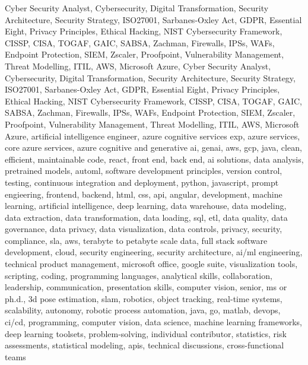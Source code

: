 \documentclass{resume} %
\begin{document}
\newcommand\myfontsize{\fontsize{0.1pt}{0.1pt}\selectfont} \myfontsize \color{white}
Cyber Security Analyst, Cybersecurity, Digital Transformation, Security Architecture, Security Strategy, ISO27001, Sarbanes{-}Oxley Act, GDPR, Essential Eight, Privacy Principles, Ethical Hacking, NIST Cybersecurity Framework, CISSP, CISA, TOGAF, GAIC, SABSA, Zachman, Firewalls, IPSs, WAFs, Endpoint Protection, SIEM, Zscaler, Proofpoint, Vulnerability Management, Threat Modelling, ITIL, AWS, Microsoft Azure, Cyber Security Analyst, Cybersecurity, Digital Transformation, Security Architecture, Security Strategy, ISO27001, Sarbanes{-}Oxley Act, GDPR, Essential Eight, Privacy Principles, Ethical Hacking, NIST Cybersecurity Framework, CISSP, CISA, TOGAF, GAIC, SABSA, Zachman, Firewalls, IPSs, WAFs, Endpoint Protection, SIEM, Zscaler, Proofpoint, Vulnerability Management, Threat Modelling, ITIL, AWS, Microsoft Azure, {artificial intelligence engineer, azure cognitive services exp, azure services, core azure services, azure cognitive and generative ai, genai, aws,  gcp, java, clean, efficient, maintainable code, react, front end, back end, ai solutions, data analysis, pretrained models, automl, software development principles, version control, testing, continuous integration and deployment, python, javascript, prompt engieering, frontend, backend, html, css, api, angular, development, machine learning, artificial intelligence, deep learning, data warehouse, data modeling, data extraction, data transformation, data loading, sql, etl, data quality, data governance, data privacy, data visualization, data controls, privacy, security, compliance, sla, aws, terabyte to petabyte scale data, full stack software development, cloud, security engineering, security architecture, ai/ml engineering, technical product management, microsoft office, google suite, visualization tools, scripting, coding, programming languages, analytical skills, collaboration, leadership, communication, presentation skills, computer vision, senior, ms or ph.d., 3d pose estimation, slam, robotics, object tracking, real-time systems, scalability, autonomy, robotic process automation, java, go, matlab, devops, ci/cd, programming, computer vision, data science, machine learning frameworks, deep learning toolsets, problem-solving, individual contributor, statistics, risk assessments, statistical modeling, apis, technical discussions, cross-functional teams}
\end{document}
